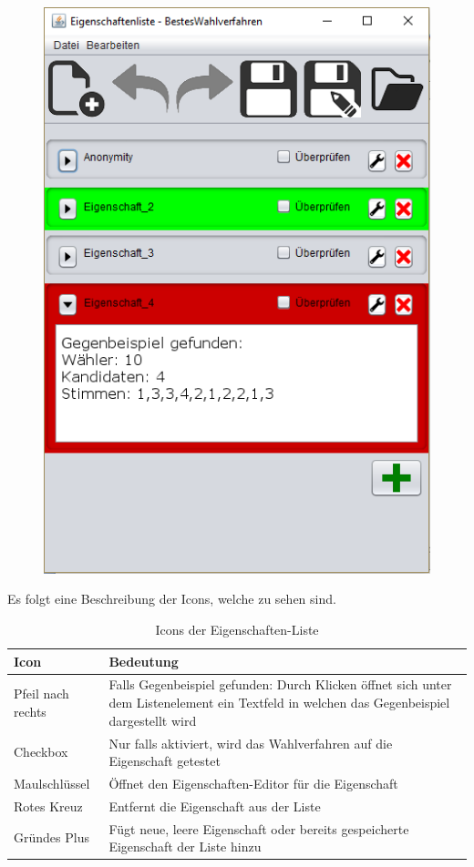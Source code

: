 \documentclass[a4paper]{scrreprt}
\begin{document}
\begin{figure}[H]
\begin{minipage}{.5\textwidth}
  \includegraphics[scale=0.5]{gegenbeispiel.png}
  \label{fig:sub2}
\end{minipage}
\end{figure}

Es folgt eine Beschreibung der Icons, welche zu sehen sind.

\begin{table}[H]
\begin{tabular}{|p{3cm}|p{12cm}|}
Icon & Bedeutung \\
\hline
Pfeil nach rechts & Falls Gegenbeispiel gefunden: Durch Klicken öffnet sich unter dem Listenelement ein Textfeld in welchen das Gegenbeispiel dargestellt wird \\
Checkbox & Nur falls aktiviert, wird das Wahlverfahren auf die Eigenschaft getestet \\
Maulschlüssel & Öffnet den Eigenschaften-Editor für die Eigenschaft\\
Rotes Kreuz & Entfernt die Eigenschaft aus der Liste \\
Gründes Plus & Fügt neue, leere Eigenschaft oder bereits gespeicherte Eigenschaft der Liste hinzu
\end{tabular}
\label{Eigenschaftenliste-Bearbeiten-Menüpunkte}
\caption{Icons der Eigenschaften-Liste}
\end{table}
\end{document}
